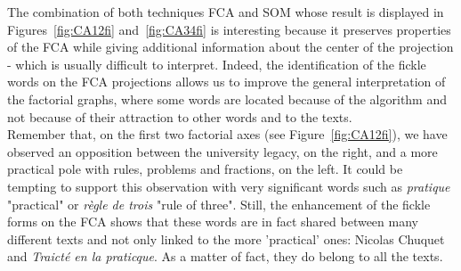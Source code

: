 \documentclass[preprint]{elsarticle}
\begin{document}
%
%
%
%

The combination of both techniques FCA and SOM whose result is displayed in Figures~\ref{fig:CA12fi} and~\ref{fig:CA34fi} is interesting because it preserves properties of the FCA while giving additional information about the center of the projection - which is usually difficult to interpret. Indeed, the identification  of the fickle words on the FCA projections allows us to improve the general interpretation of the factorial graphs, where some words are located because of the algorithm and not because of their attraction to other words and to the texts.\\

Remember that, on the first two factorial axes (see Figure~\ref{fig:CA12fi}), we have observed an opposition between the university legacy, on the right, and a more practical pole with rules, problems and fractions, on the left. It could be tempting to support this observation with very significant words such as \textit{pratique} "practical" or \textit{règle de trois} "rule of three". Still, the enhancement of the fickle forms on the FCA shows that these words are in fact shared between many different texts and not only linked to the more 'practical' ones: Nicolas Chuquet and \textit{Traict\'e en la praticque}. As a matter of fact, they do belong to all the texts.\\ 


\end{document}
